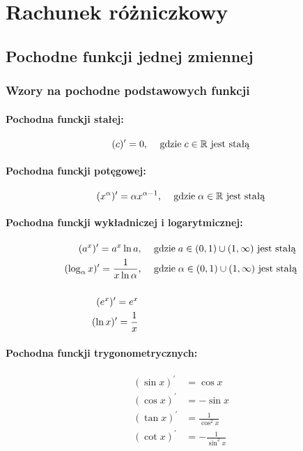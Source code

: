 \documentclass[../Matematyka.tex]{subfiles}
\begin{document}
    \newcommand{\bis}{^{\prime\prime}}
    \newcommand{\prim}{^\prime}

    \section{Rachunek różniczkowy}

    \subsection{Pochodne funkcji jednej zmiennej}

    \subsubsection{Wzory na pochodne podstawowych funkcji}

    \paragraph{Pochodna funckji stałej:}
    \[ (c)\prim = 0 \text{, \quad gdzie} \; c \in \mathbb{R} \text{ jest stałą} \]
    
    \paragraph{Pochodna funckji potęgowej:}
    \[ (x^\alpha)\prim = \alpha x^{\alpha-1} \text{, \quad gdzie} \; \alpha \in \mathbb{R} \text{ jest stałą} \]
    
    \paragraph{Pochodna funckji wykładniczej i logarytmicznej:}
    \begin{align*}
        (a^x)\prim = a^x \ln a &\text{, \quad gdzie} \; a \in (0, 1) \cup (1, \infty) \text{ jest stałą} \\
        (\log_\alpha x)\prim = \frac{1}{x \ln \alpha} &\text{, \quad gdzie} \; \alpha \in (0, 1) \cup (1, \infty) \text{ jest stałą} \\
        \\
        (e^x)\prim = e^x \\
        (\ln x)\prim = \frac{1}{x}
    \end{align*}

    \paragraph{Pochodna funckji trygonometrycznych:}
    \begin{align*}
        (\sin x)\prim &= \cos x \\
        (\cos x)\prim &= - \sin x \\
        (\tan x)\prim &= \frac{1}{\cos^2 x} \\
        (\cot x)\prim &= - \frac{1}{\sin^2 x} \\
    \end{align*}
\end{document}

